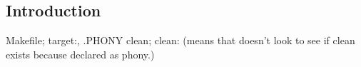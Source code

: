 
\subsection{Introduction}

Makefile; target:, .PHONY clean; clean: (means that doesn't look to see if clean exists because declared as phony.)